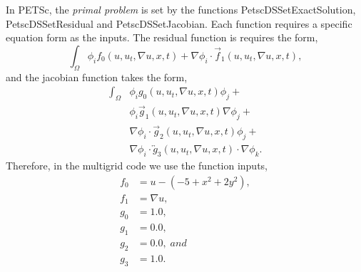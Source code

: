 \documentclass[]{article}
\theoremstyle{definition}
\begin{document}
In PETSc, the \textit{primal problem} is set by the functions PetscDSSetExactSolution, PetscDSSetResidual and PetscDSSetJacobian.  Each function requires a specific equation form as the inputs.  The residual function is requires the form,
\begin{equation}
\int_\Omega \phi_i f_0(u, u_t, \nabla u, x, t) + \nabla\phi_i \cdot {\vec f}_1(u, u_t, \nabla u, x, t),
\end{equation}
and the jacobian function takes the form,
\begin{equation}
\begin{split}
\int_\Omega &\phi_i g_0(u, u_t, \nabla u, x, t) \phi_j + \\
&\phi_i {\vec g}_1(u, u_t, \nabla u, x, t) \nabla \phi_j + \\
&\nabla\phi_i \cdot {\vec g}_2(u, u_t, \nabla u, x, t) \phi_j + \\
&\nabla\phi_i \cdot {\overleftrightarrow g}_3(u, u_t, \nabla u, x, t) \cdot \nabla \phi_k.
\end{split}
\end{equation}
Therefore, in the multigrid code we use the function inputs,
\begin{align}
f_0 &= u - (-5 + x^2 + 2 y^2), \\
f_1 &= \nabla u, \\
g_0 &= 1.0, \\
g_1 &= 0.0, \\
g_2 &= 0.0,\; and \\
g_3 &= 1.0.
\end{align}




\printbibliography 
\end{document}
